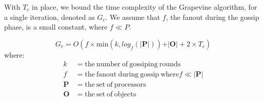 With $T_c$ in place, we bound the time complexity of the \textsf{Grapevine}
algorithm, for a single iteration, denoted as $G_c$. We assume that $f$, the
fanout during the gossip phase, is a small constant, where $f \ll P$.

\[
G_c = O(f\times \mathrm{min}(k, log_f(\vert\mathbf{P}\vert)) + \vert\mathbf{O}\vert + 2 \times T_c)
\]
where:
\begin{align*}
 k          & = \mathrm{the\ number\ of\ gossiping\ rounds} \\
 f          & = \mathrm{the\ fanout\ during\ gossip\ where} f \ll \vert\mathbf{P}\vert \\
 \mathbf{P} & = \mathrm{the\ set\ of\ processors} \\
 \mathbf{O} & = \mathrm{the\ set\ of\ objects}
\end{align*}

%

